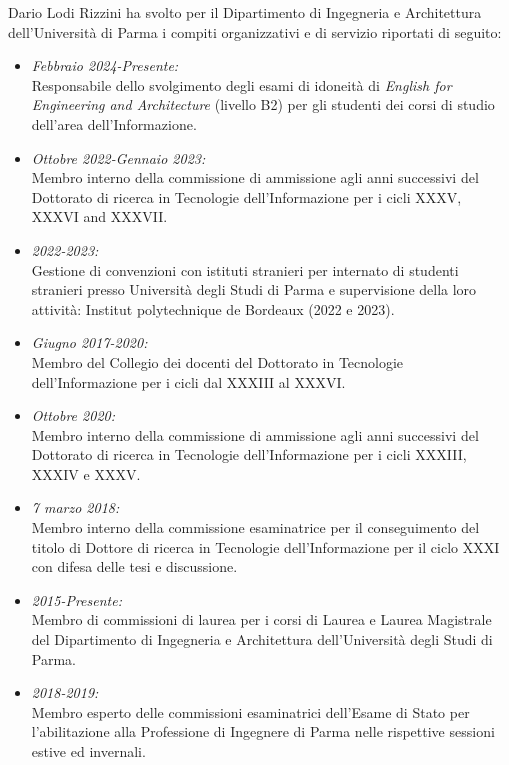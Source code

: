 \documentclass[11pt]{article}
\newcommand{\ITEMDATE}[1]{\item \textit{#1:}\\}
\begin{document}
Dario Lodi Rizzini ha svolto per il Dipartimento di Ingegneria e Architettura dell'Universit\`a di Parma i compiti organizzativi e di servizio riportati di seguito:
\begin{itemize}

\ITEMDATE{Febbraio 2024-Presente} 
Responsabile dello svolgimento degli esami di idoneit\`a di \emph{English for Engineering and Architecture} (livello B2) per gli studenti dei corsi di studio dell'area dell'Informazione.

\ITEMDATE{Ottobre 2022-Gennaio 2023} 
Membro interno della commissione di ammissione agli anni successivi del Dottorato di ricerca in Tecnologie dell'Informazione per i cicli XXXV, XXXVI and XXXVII.

\ITEMDATE{2022-2023} 
Gestione di convenzioni con istituti stranieri per internato di studenti stranieri presso Universit\`a degli Studi di Parma e supervisione della loro attivit\`a: Institut polytechnique de Bordeaux (2022 e 2023). 

\ITEMDATE{Giugno 2017-2020} 
Membro del Collegio dei docenti del Dottorato in Tecnologie dell'Informazione per i cicli dal XXXIII al XXXVI.

\ITEMDATE{Ottobre 2020} 
Membro interno della commissione di ammissione agli anni successivi del Dottorato di ricerca in Tecnologie dell'Informazione per i cicli XXXIII, XXXIV e XXXV. 

\ITEMDATE{7 marzo 2018} 
Membro interno della commissione esaminatrice per il conseguimento del titolo di Dottore di ricerca in Tecnologie dell'Informazione per il ciclo XXXI con difesa delle tesi e discussione.

\ITEMDATE{2015-Presente} 
Membro di commissioni di laurea per i corsi di Laurea e Laurea Magistrale del Dipartimento di Ingegneria e Architettura dell'Universit\`a degli Studi di Parma.

\ITEMDATE{2018-2019} 
Membro esperto delle commissioni esaminatrici dell'Esame di Stato per l'abilitazione alla Professione di Ingegnere di Parma nelle rispettive sessioni estive ed invernali. 

\end{itemize}


\end{document}
